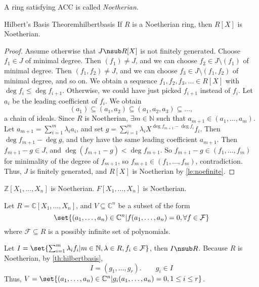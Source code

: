 \begin{definition}{}{}
    A ring satisfying ACC is called \textit{Noetherian}.
\end{definition}
\begin{theorem}{Hilbert's Basis Theorem}{hilbertbasis}
    If \(R\) is a Noetherian ring, then \(R[X]\) is Noetherian.
\end{theorem}
\begin{proof}
    Assume otherwise that \(J \nsub R[X]\) is not finitely generated. Choose \(f_1 \in J\) of minimal degree. Then \((f_1) \neq J\), and we can choose \(f_2 \in J \setminus (f_1)\) of minimal degree. Then \((f_1, f_2) \neq J\), and we can choose \(f_3 \in J \setminus (f_1, f_2)\) of minimal degree, and so on. We obtain a sequence \(f_1, f_2, f_3, \dots \in R[X]\) with \(\deg f_i \leq \deg f_{i+1}\). Otherwise, we could have just picked \(f_{i+1}\) instead of \(f_i\). Let \(a_i\) be the leading coefficient of \(f_i\). We obtain
    \[
        (a_1) \subseteq (a_1, a_2) \subseteq (a_1, a_2, a_3) \subseteq \dots,
    \]
    a chain of ideals. Since \(R\) is Noetherian, \(\exists m \in \mathbb{N}\) such that \(a_{m+1} \in (a_1, \dots, a_m)\). Let \(a_{m+1} = \sum_{i=1}^m \lambda_i a_i\), and set \(g = \sum_{i=1}^m \lambda_i X^{\deg f_{m+1} - \deg f_i} f_i\). Then \(\deg f_{m+1} - \deg g\), and they have the same leading coefficient \(a_{m+1}\). Then \(f_{m+1} - g \in J\), and \(\deg (f_{m+1} - g) < \deg f_{m+1}\). So \(f_{m+1} - g \in (f_1,\dots, f_m)\) for minimality of the degree of \(f_{m+1}\), so \(f_{m+1} \in (f_1,\dots,f_m)\), contradiction. Thus, \(J\) is finitely generated, and \(R[X]\) is Noetherian by \cref{le:noefinite}.
\end{proof}
\begin{corollary}{}{}
    \(\mathbb{Z}[X_1, \dots, X_n]\) is Noetherian. \(F[X_1, \dots, X_n]\) is Noetherian.
\end{corollary}
\begin{example}
    Let \(R = \mathbb{C}[X_1, \dots, X_n]\), and \(V \subseteq \mathbb{C}^n\) be a subset of the form
    \[
        \set{(a_1, \dots, a_n) \in \mathbb{C}^n | f(a_1, \dots, a_n) = 0, \forall f \in \mathcal{F}}
    \]
    where \(\mathcal{F} \subseteq R\) is a possibly infinite set of polynomials.

    Let \(I = \set{\sum_{i=1}^m \lambda_i f_i | m \in \mathbb{N}, \lambda \in R, f_i \in \mathcal{F}}\), then \(I \nsub R\). Because \(R\) is Noetherian, by \cref{th:hilbertbasis},
    \[
        I = (g_1, \dots, g_r). \qquad g_i \in I
    \]
    Thus, \(V = \set{(a_1,\dots, a_n)\in \mathbb{C}^n| g_i(a_1, \dots, a_n) = 0, 1\leq i \leq r}\).
\end{example}
